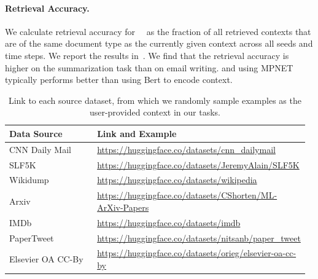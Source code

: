 \paragraph{Retrieval Accuracy.} We calculate retrieval accuracy for ~\algname~as the fraction of all retrieved
contexts that are of the same document type as the currently given context across all seeds and time steps.  We report the results in~. We find that the retrieval accuracy is higher on the summarization task than on email writing. and using MPNET typically performs better than using Bert to encode context.






\begin{table}[h!]
    \centering \small
    \caption{Link to each source dataset, from which we randomly sample examples as the user-provided context in our tasks.} 
    \setlength{\tabcolsep}{0.01\linewidth}
    \begin{tabular}{p{0.3\linewidth} p{0.67\linewidth}}
        \toprule
        \textbf{Data Source} & \textbf{Link and Example} \\
        \midrule
        CNN Daily Mail \citep{see-etal-2017-get} & \url{https://huggingface.co/datasets/cnn_dailymail} \\
        SLF5K  \citep{Stiennon2020LearningTS} & \url{https://huggingface.co/datasets/JeremyAlain/SLF5K} \\
        Wikidump  \citep{wikidump} & \url{https://huggingface.co/datasets/wikipedia} \\
        Arxiv \citep{clement2019arxiv} & \url{https://huggingface.co/datasets/CShorten/ML-ArXiv-Papers} \\
 
        IMDb \citep{maas-EtAl:2011:ACL-HLT2011} & \url{https://huggingface.co/datasets/imdb}  \\
        PaperTweet \citep{Bar_PaperTweet} & \url{https://huggingface.co/datasets/nitsanb/paper_tweet} \\
         Elsevier OA CC-By \citep{Kershaw2020ElsevierOC} & \url{https://huggingface.co/datasets/orieg/elsevier-oa-cc-by} \\
 
        \bottomrule
    \end{tabular}   
    \label{tab:context_link_example}
\end{table}


